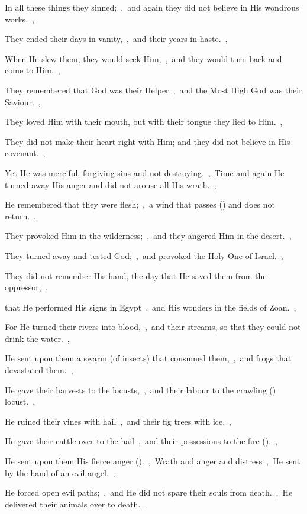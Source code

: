 \documentclass[12pt,twoside,a5paper]{article}
\begin{document}
\begin{halfparskip}
  In all these things they sinned;~\sep\ and again they did not believe in His wondrous works.~\sep

  They ended their days in vanity,~\sep\ and their years in haste.~\sep

  When He slew them, they would seek Him;~\sep\ and they would turn back and come to Him.~\sep

  They remembered that God was their Helper~\sep\ and the Most High God was their Saviour.~\sep

  They loved Him with their mouth, but with their tongue they lied to Him.~\sep

  They did not make their heart right with Him; and they did not believe in His covenant.~\sep

  Yet He was merciful, forgiving sins and not destroying.~\sep\ Time and again He turned away His anger and did not arouse all His wrath.~\sep

  He remembered that they were flesh;~\sep\ a wind that passes () and does not return.~\sep

  They provoked Him in the wilderness;~\sep\ and they angered Him in the desert.~\sep

  They turned away and tested God;~\sep\ and provoked the Holy One of Israel.~\sep

  They did not remember His hand, the day that He saved them from the oppressor,~\sep

  that He performed His signs in Egypt~\sep\ and His wonders in the fields of Zoan.~\sep

  For He turned their rivers into blood,~\sep\ and their streams, so that they could not drink the water.~\sep

  He sent upon them a swarm (of insects) that consumed them,~\sep\ and frogs that devastated them.~\sep

  He gave their harvests to the locusts,~\sep\ and their labour to the crawling () locust.~\sep

  He ruined their vines with hail~\sep\ and their fig trees with ice.~\sep

  He gave their cattle over to the hail~\sep\ and their possessions to the fire ().~\sep

  He sent upon them His fierce anger ().~\sep\ Wrath and anger and distress~\sep\ He sent by the hand of an evil angel.~\sep

  He forced open evil paths;~\sep\ and He did not spare their souls from death.~\sep\ He delivered their animals over to death.~\sep


\end{halfparskip}
\end{document}
